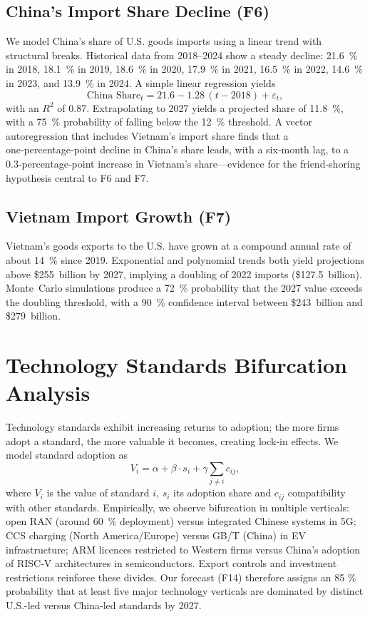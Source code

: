 \documentclass[12pt]{article}
\begin{document}
\subsection{China’s Import Share Decline (F6)}

We model China’s share of U.S. goods imports using a linear trend with structural breaks.  Historical data from 2018–2024 show a steady decline: 21.6 \% in 2018, 18.1 \% in 2019, 18.6 \% in 2020, 17.9 \% in 2021, 16.5 \% in 2022, 14.6 \% in 2023, and 13.9 \% in 2024.  A simple linear regression yields
\begin{equation}
\text{China Share}_{t} = 21.6 - 1.28\,(t-2018) + \varepsilon_t,
\end{equation}
with an $R^2$ of 0.87.  Extrapolating to 2027 yields a projected share of 11.8 \%, with a 75 \% probability of falling below the 12 \% threshold.  A vector autoregression that includes Vietnam’s import share finds that a one‑percentage‑point decline in China’s share leads, with a six‑month lag, to a 0.3‑percentage‑point increase in Vietnam’s share—evidence for the friend‑shoring hypothesis central to F6 and F7.

\subsection{Vietnam Import Growth (F7)}

Vietnam’s goods exports to the U.S. have grown at a compound annual rate of about 14 \% since 2019.  Exponential and polynomial trends both yield projections above \$255 billion by 2027, implying a doubling of 2022 imports (\$127.5 billion).  Monte Carlo simulations produce a 72 \% probability that the 2027 value exceeds the doubling threshold, with a 90 \% confidence interval between \$243 billion and \$279 billion.

\section{Technology Standards Bifurcation Analysis}

Technology standards exhibit increasing returns to adoption; the more firms adopt a standard, the more valuable it becomes, creating lock‑in effects.  We model standard adoption as
\begin{equation}
V_i = \alpha + \beta \cdot s_i + \gamma \sum_{j \neq i} c_{ij},
\end{equation}
where $V_i$ is the value of standard $i$, $s_i$ its adoption share and $c_{ij}$ compatibility with other standards.  Empirically, we observe bifurcation in multiple verticals: open RAN (around 60 \% deployment) versus integrated Chinese systems in 5G; CCS charging (North America/Europe) versus GB/T (China) in EV infrastructure; ARM licences restricted to Western firms versus China’s adoption of RISC‑V architectures in semiconductors.  Export controls and investment restrictions reinforce these divides.  Our forecast (F14) therefore assigns an 85 \% probability that at least five major technology verticals are dominated by distinct U.S.-led versus China‑led standards by 2027.
\end{document}
